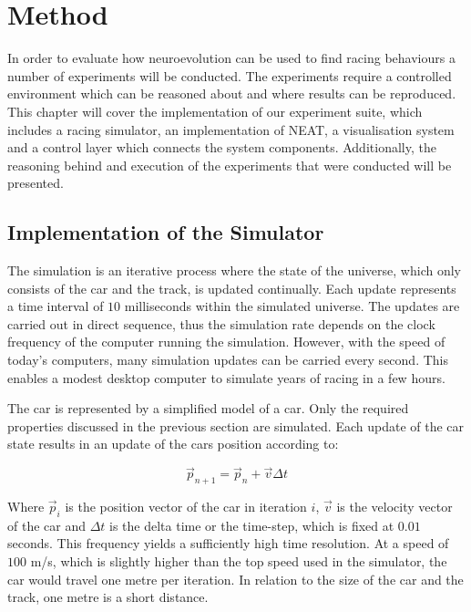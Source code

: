 
\chapter{Method}

In order to evaluate how neuroevolution can be used to find racing behaviours a number of experiments will be conducted. The experiments require a controlled environment which can be reasoned about and where results can be reproduced. This chapter will cover the implementation of our experiment suite, which includes a racing simulator, an implementation of NEAT, a visualisation system and a control layer which connects the system components. Additionally, the reasoning behind and execution of the experiments that were conducted will be presented. 

\section{Implementation of the Simulator}

The simulation is an iterative process where the state of the universe, which only consists of the car and the track, is updated continually. Each update represents a time interval of $10$ milliseconds within the simulated universe. The updates are carried out in direct sequence, thus the simulation rate depends on the clock frequency of the computer running the simulation. However, with the speed of today's computers, many simulation updates can be carried every second. This enables a modest desktop computer to simulate years of racing in a few hours. 

The car is represented by a simplified model of a car. Only the required properties discussed in the previous section are simulated. Each update of the car state results in an update of the cars position according to:

\begin{equation}
    \vec{p}_{n+1} = \vec{p}_{n} + \vec{v}\Delta t 
\end{equation}

\noindent
Where $\vec{p}_i$ is the position vector of the car in iteration $i$, $\vec{v}$ is the velocity vector of the car and $\Delta t$ is the delta time or the time-step, which is fixed at $0.01$ seconds. This frequency yields a sufficiently high time resolution. At a speed of $100$ m/s, which is slightly higher than the top speed used in the simulator, the car would travel one metre per iteration. In relation to the size of the car and the track, one metre is a short distance.

